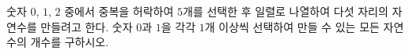 숫자 $0$, $1$, $2$ 중에서 중복을 허락하여 $5$개를 선택한 후 일렬로 나열하여 다섯 자리의 자연수를 만들려고 한다. 숫자 $0$과 \mbox{$1$을} 각각 $1$개 이상씩 선택하여 만들 수 있는 모든 자연수의 개수를 구하시오.
